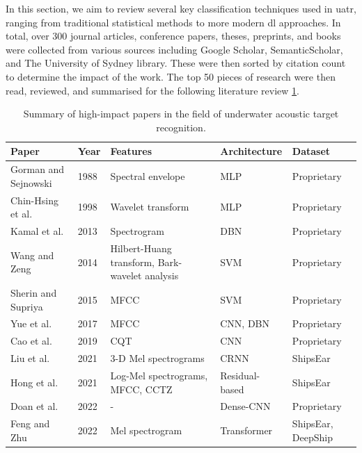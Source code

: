 In this section, we aim to review several key classification techniques used in \acrshort{uatr}, ranging from traditional statistical methods to more modern \acrlong{dl} approaches. In total, over 300 journal articles, conference papers, theses, preprints, and books were collected from various sources including Google Scholar, SemanticScholar, and The University of Sydney library. These were then sorted by citation count to determine the impact of the work. The top 50 pieces of research were then read, reviewed, and summarised for the following literature review \ref{tab:classification-review-summary}.

\begin{table}
\centering
\begin{tabular}{lllll}
\toprule
\textbf{Paper} & \textbf{Year} & \textbf{Features} & \textbf{Architecture} & \textbf{Dataset} \\ \midrule
Gorman and Sejnowski \cite{gorman_analysis_1988} & 1988 & Spectral envelope & MLP & Proprietary \\
Chin-Hsing et al. \cite{chin-hsing_classification_1998} & 1998 & Wavelet transform & MLP & Proprietary \\
Kamal et al. \cite{kamal_deep_2013} & 2013 & Spectrogram & DBN & Proprietary \\
Wang and Zeng \cite{wang_robust_2014} & 2014 & Hilbert-Huang transform, Bark-wavelet analysis & SVM & Proprietary \\
Sherin and Supriya \cite{sherin_b_m_selection_2015} & 2015 & MFCC & SVM & Proprietary \\
Yue et al. \cite{yue_classification_2017} & 2017 & MFCC & CNN, DBN & Proprietary \\
Cao et al. \cite{cao_convolutional_2019} & 2019 & CQT & CNN & Proprietary \\
Liu et al. \cite{liuUnderwaterTargetRecognition2021} & 2021 & 3-D Mel spectrograms & CRNN & ShipsEar \\
Hong et al. \cite{hong_underwater_2021, hongUnderwaterAcousticTarget2021a} & 2021 & Log-Mel spectrograms, MFCC, CCTZ & Residual-based & ShipsEar \\
Doan et al. \cite{doan_underwater_2022} & 2022 & - & Dense-CNN & Proprietary \\
Feng and Zhu \cite{feng_transformer-based_2022} & 2022 & Mel spectrogram & Transformer & ShipsEar, DeepShip\\ \bottomrule
\end{tabular}
\caption{Summary of high-impact papers in the field of underwater acoustic target recognition.}
\label{tab:classification-review-summary}
\end{table}

